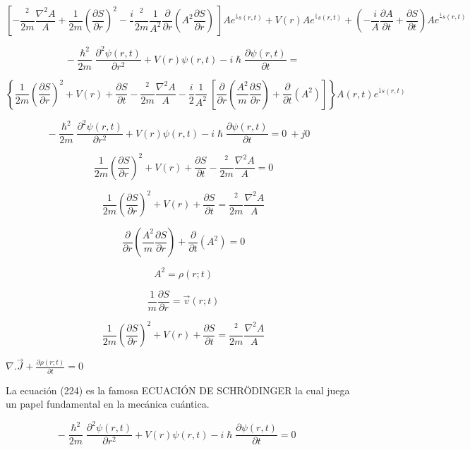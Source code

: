 \documentclass[]{article}
\begin{document}
\[\left\lbrack - \frac{{}^{2}}{2m}\frac{\nabla^{2}A}{A} + \frac{1}{2m}\left( \frac{\partial S}{\partial r} \right)^{2} - \frac{i}{}\frac{{}^{2}}{2m}\frac{1}{A^{2}}\frac{\partial}{\partial r}\left( A^{2}\frac{\partial S}{\partial r} \right)\  \right\rbrack Ae^{\frac{i}{}s(r,t)} + V(r)Ae^{\frac{i}{}s(r,t)} + \left( - \frac{i}{A}\frac{\partial A}{\partial t} + \frac{\partial S}{\partial t} \right){Ae}^{\frac{i}{}s(r,t)}\]

\[- \frac{\hslash^{2}}{2m}\frac{\partial^{2}\psi(r,t)}{\partial r^{2}} + V(r)\psi(r,t) - i\hslash\frac{\partial\psi(r,t)}{\partial t} =\]

\[\left\{ \frac{1}{2m}\left( \frac{\partial S}{\partial r} \right)^{2} + V(r) + \frac{\partial S}{\partial t} - \frac{{}^{2}}{2m}\frac{\nabla^{2}A}{A} - \frac{i}{2}\frac{1}{A^{2}}\ \left\lbrack \frac{\partial}{\partial r}\left( \frac{A^{2}}{m}\frac{\partial S}{\partial r} \right) + \frac{\partial}{\partial t}\left( A^{2} \right) \right\rbrack \right\} A(r,t)e^{\frac{i}{}s(r,t)}\]

\[- \frac{\hslash^{2}}{2m}\frac{\partial^{2}\psi(r,t)}{\partial r^{2}} + V(r)\psi(r,t) - i\hslash\frac{\partial\psi(r,t)}{\partial t} = 0\  + j0\ \ \ \ \]

\[\frac{1}{2m}\left( \frac{\partial S}{\partial r} \right)^{2} + V(r) + \frac{\partial S}{\partial t} - \frac{{}^{2}}{2m}\frac{\nabla^{2}A}{A} = 0\]

\[\frac{1}{2m}\left( \frac{\partial S}{\partial r} \right)^{2} + V(r) + \frac{\partial S}{\partial t} = \frac{{}^{2}}{2m}\frac{\nabla^{2}A}{A}\]

\[\frac{\partial}{\partial r}\left( \frac{A^{2}}{m}\frac{\partial S}{\partial r} \right) + \frac{\partial}{\partial t}\left( A^{2} \right) = 0\]

\[A^{2} = \rho(r;t)\]

\[\frac{1}{m}\frac{\partial S}{\partial r} = \overrightarrow{v}(r;t)\]

\[\frac{1}{2m}\left( \frac{\partial S}{\partial r} \right)^{2} + V(r) + \frac{\partial S}{\partial t} = \frac{{}^{2}}{2m}\frac{\nabla^{2}A}{A}\]

\(\nabla.\overrightarrow{J} + \frac{\partial\rho(r;t)}{\partial t} = 0\)

La ecuación (224) es la famosa ECUACIÓN DE SCHRÖDINGER la cual juega un
papel fundamental en la mecánica cuántica.

\[- \frac{\hslash^{2}}{2m}\frac{\partial^{2}\psi(r,t)}{\partial r^{2}} + V(r)\psi(r,t) - i\hslash\frac{\partial\psi(r,t)}{\partial t} = 0\ \ \ \ \ \ \]
\end{document}
